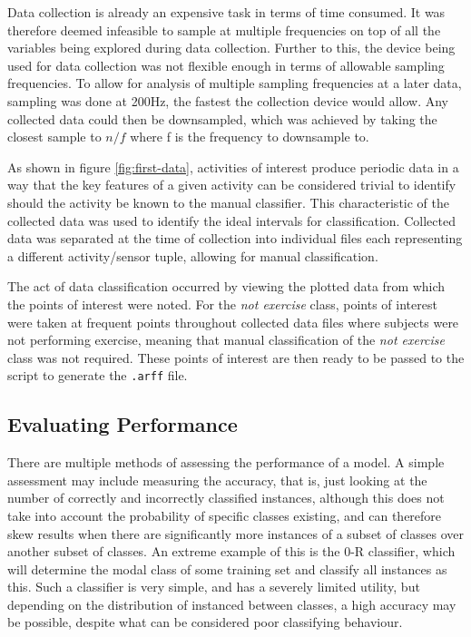 Data collection is already an expensive task in terms of time consumed. It was therefore deemed infeasible to sample at multiple frequencies on top of all the variables being explored during data collection. Further to this, the device being used for data collection was not flexible enough in terms of allowable sampling frequencies. To allow for analysis of multiple sampling frequencies at a later data, sampling was done at 200Hz, the fastest the collection device would allow. Any collected data could then be downsampled, which was achieved by taking the closest sample to $n/f$ where f is the frequency to downsample to.

As shown in figure \ref{fig:first-data}, activities of interest produce periodic data in a way that the key features of a given activity can be considered trivial to identify should the activity be known to the manual classifier. This characteristic of the collected data was used to identify the ideal intervals for classification. Collected data was separated at the time of collection into individual files each representing a different activity/sensor tuple, allowing for manual classification. 

The act of data classification occurred by viewing the plotted data from which the points of interest were noted. For the \textit{not exercise} class, points of interest were taken at frequent points throughout collected data files where subjects were not performing exercise, meaning that manual classification of the \textit{not exercise} class was not required. These points of interest are then ready to be passed to the script to generate the \texttt{.arff} file.

\subsection{Evaluating Performance}
There are multiple methods of assessing the performance of a model. A simple assessment may include measuring the accuracy, that is, just looking at the number of correctly and incorrectly classified instances, although this does not take into account the probability of specific classes existing, and can therefore skew results when there are significantly more instances of a subset of classes over another subset of classes. An extreme example of this is the 0-R classifier, which will determine the modal class of some training set and classify all instances as this. Such a classifier is very simple, and has a severely limited utility, but depending on the distribution of instanced between classes, a high accuracy may be possible, despite what can be considered poor classifying behaviour.

